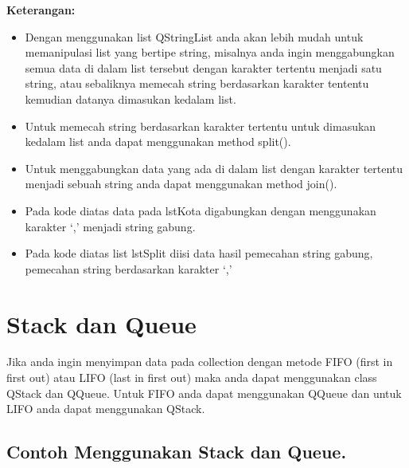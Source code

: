 \textbf{Keterangan:}

\begin{itemize}

\item
  Dengan menggunakan list QStringList anda akan lebih mudah untuk
  memanipulasi list yang bertipe string, misalnya anda ingin
  menggabungkan semua data di dalam list tersebut dengan karakter
  tertentu menjadi satu string, atau sebaliknya memecah string
  berdasarkan karakter tententu kemudian datanya dimasukan kedalam list.
\item
  Untuk memecah string berdasarkan karakter tertentu untuk dimasukan
  kedalam list anda dapat menggunakan method split().
\item
  Untuk menggabungkan data yang ada di dalam list dengan karakter
  tertentu menjadi sebuah string anda dapat menggunakan method join().
\item
  Pada kode diatas data pada lstKota digabungkan dengan menggunakan
  karakter `,' menjadi string gabung.
\item
  Pada kode diatas list lstSplit diisi data hasil pemecahan string
  gabung, pemecahan string berdasarkan karakter `,'
\end{itemize}

\section{Stack dan Queue}\label{stack-dan-queue}

Jika anda ingin menyimpan data pada collection dengan metode FIFO (first
in first out) atau LIFO (last in first out) maka anda dapat menggunakan
class QStack dan QQueue. Untuk FIFO anda dapat menggunakan QQueue dan
untuk LIFO anda dapat menggunakan QStack.

\subsection*{Contoh Menggunakan Stack dan Queue.}

